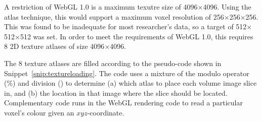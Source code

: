 A restriction of WebGL 1.0 is a maximum texutre size of 4096$\times$4096.
Using the atlas technique, this would support a maximum voxel resolution of 256$\times$256$\times$256.
This was found to be inadequate for most researcher's data, so a target of 512$\times$512$\times$512 was set.
In order to meet the requirements of WebGL 1.0, this requires 8 2D texture atlases of size 4096$\times$4096.

The 8 texture atlases are filled according to the pseudo-code shown in Snippet~\ref{snip:textureloading}.
The code uses a mixture of the modulo operator (\%) and division (\/) to determine (a) which atlas to place each volume image slice in, and (b) the location in that image where the slice should be located.
Complementary code runs in the WebGL rendering code to read a particular voxel's colour given an $xyz$-coordinate.

